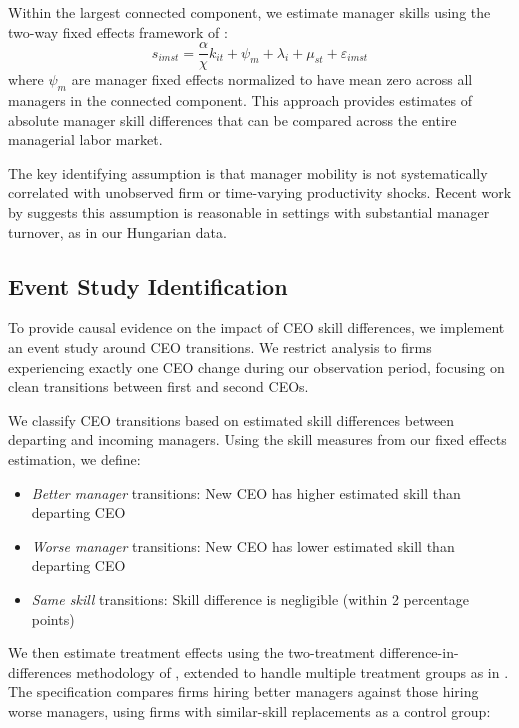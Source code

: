 \documentclass[11pt,a4paper]{article}
\begin{document}
Within the largest connected component, we estimate manager skills using the two-way fixed effects framework of \citet{abowd1999high}:
\begin{equation}
s_{imst} = \frac{\alpha}{\chi} k_{it} + \psi_m + \lambda_i + \mu_{st} + \varepsilon_{imst}
\end{equation}
where $\psi_m$ are manager fixed effects normalized to have mean zero across all managers in the connected component. This approach provides estimates of absolute manager skill differences that can be compared across the entire managerial labor market.

The key identifying assumption is that manager mobility is not systematically correlated with unobserved firm or time-varying productivity shocks. Recent work by \citet{metcalfe2023managers} suggests this assumption is reasonable in settings with substantial manager turnover, as in our Hungarian data.

\subsection{Event Study Identification}

To provide causal evidence on the impact of CEO skill differences, we implement an event study around CEO transitions. We restrict analysis to firms experiencing exactly one CEO change during our observation period, focusing on clean transitions between first and second CEOs.

We classify CEO transitions based on estimated skill differences between departing and incoming managers. Using the skill measures from our fixed effects estimation, we define:
\begin{itemize}
\item \textit{Better manager} transitions: New CEO has higher estimated skill than departing CEO
\item \textit{Worse manager} transitions: New CEO has lower estimated skill than departing CEO  
\item \textit{Same skill} transitions: Skill difference is negligible (within 2 percentage points)
\end{itemize}

We then estimate treatment effects using the two-treatment difference-in-differences methodology of \citet{Callaway2021JoLE}, extended to handle multiple treatment groups as in \citet{Koren2023expat}. The specification compares firms hiring better managers against those hiring worse managers, using firms with similar-skill replacements as a control group:
\end{document}

